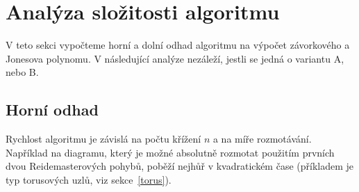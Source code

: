 \section{Analýza složitosti algoritmu}  \label{analyza}
V teto sekci vypočteme horní a dolní odhad algoritmu na výpočet závorkového a Jonesova polynomu. V následující analýze nezáleží, jestli se jedná o variantu A, nebo B.
\subsection{Horní odhad}
Rychlost algoritmu je závislá na počtu křížení $n$ a na míře rozmotávání. Například na diagramu, který je možné absolutně rozmotat použitím prvních dvou Reidemasterových pohybů, poběží nejhůř v kvadratickém čase (příkladem je typ torusových uzlů, viz sekce~\ref{torus}).

